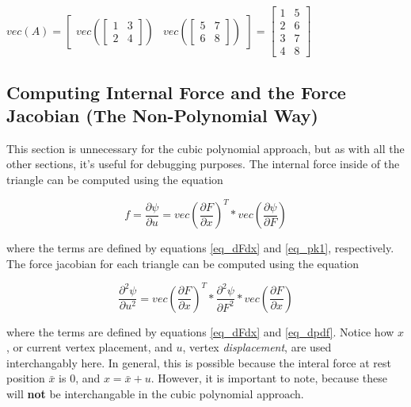 \documentclass[twocolumn,10pt]{asme2ej}
\begin{document}
\begin{center}
$vec(A) = \begin{bmatrix} vec(\begin{bmatrix} 1 & 3 \\ 2 & 4 \end{bmatrix}) & vec(\begin{bmatrix} 5 & 7 \\ 6 & 8 \end{bmatrix}) \end{bmatrix} = \begin{bmatrix} 1 & 5 \\ 2 & 6 \\ 3 & 7 \\ 4 & 8 \end{bmatrix}$
\end{center}

\subsection{Computing Internal Force and the Force Jacobian (The Non-Polynomial Way)}

This section is unnecessary for the cubic polynomial approach, but as with all the other sections, it's useful for debugging purposes. The internal force inside of the triangle can be computed using the equation

\begin{equation}
f = \frac{\partial \psi}{\partial u} = vec(\frac{\partial F}{\partial x})^T*vec(\frac{\partial \psi}{\partial F})
\label{eq_triforce}
\end{equation}

where the terms are defined by equations \ref{eq_dFdx} and \ref{eq_pk1}, respectively. The force jacobian for each triangle can be computed using the equation

\begin{equation}
\frac{\partial^2 \psi}{\partial u^2} = vec(\frac{\partial F}{\partial x})^T*\frac{\partial^2 \psi}{\partial F^2}*vec(\frac{\partial F}{\partial x})
\label{eq_trijacob}
\end{equation}

where the terms are defined by equations \ref{eq_dFdx} and \ref{eq_dpdf}. Notice how $x$, or current vertex placement, and $u$, vertex \textit{displacement}, are used interchangably here. In general, this is possible because the interal force at rest position $\bar{x}$ is $0$, and $x = \bar{x} + u$. However, it is important to note, because these will \textbf{not} be interchangable in the cubic polynomial approach.
\end{document}
